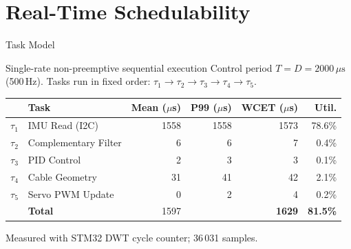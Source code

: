 \documentclass[10pt]{beamer}
\begin{document}
\section{Real-Time Schedulability}

\begin{frame}{Task Model}
  \begin{block}{Single-rate non-preemptive sequential execution}
    Control period $T = D = 2000\,\mu\text{s}$ (500\,Hz).
    Tasks run in fixed order: $\tau_1 \to \tau_2 \to \tau_3 \to \tau_4 \to \tau_5$.
  \end{block}

  \vspace{0.3em}
  \begin{center}
  \small
  \begin{tabular}{llrrrr}
  \toprule
  & \textbf{Task} & \textbf{Mean ($\mu$s)} & \textbf{P99 ($\mu$s)} & \textbf{WCET ($\mu$s)} & \textbf{Util.} \\
  \midrule
  $\tau_1$ & IMU Read (I2C)        & 1558 & 1558 & 1573 & 78.6\% \\
  $\tau_2$ & Complementary Filter  &    6 &    6 &    7 &  0.4\% \\
  $\tau_3$ & PID Control           &    2 &    3 &    3 &  0.1\% \\
  $\tau_4$ & Cable Geometry        &   31 &   41 &   42 &  2.1\% \\
  $\tau_5$ & Servo PWM Update      &    0 &    2 &    4 &  0.2\% \\
  \midrule
  & \textbf{Total}              & 1597 &      & \textbf{1629} & \textbf{81.5\%} \\
  \bottomrule
  \end{tabular}
  \end{center}
  Measured with STM32 DWT cycle counter; 36\,031 samples.
\end{frame}
\end{document}
